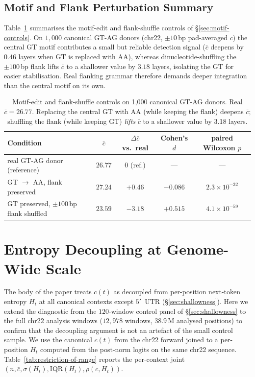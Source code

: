 \documentclass{article}
\theoremstyle{plain}
\theoremstyle{definition}
\theoremstyle{remark}
\begin{document}
\subsection{Motif and Flank Perturbation Summary}
\label{app:motif-flank}

Table~\ref{tab:motif-flank} summarises the motif-edit and flank-shuffle
controls of \S\ref{sec:motif-controls}. On $1{,}000$ canonical GT-AG
donors (chr22, $\pm 10$\,bp pad-averaged $c$) the central GT motif
contributes a small but reliable detection signal ($\bar c$ deepens by
$0.46$ layers when GT is replaced with AA), whereas dinucleotide-shuffling
the $\pm 100$\,bp flank lifts $\bar c$ to a shallower value by $3.18$ layers, isolating the
GT for easier stabilisation. Real flanking grammar therefore demands
deeper integration than the central motif on its own.

\begin{table}[!htbp]
  \caption{Motif-edit and flank-shuffle controls on 1{,}000 canonical
    GT-AG donors. Real $\bar c\!=\!26.77$. Replacing the central GT with AA
    (while keeping the flank) deepens $\bar c$; shuffling the flank
  (while keeping GT) \emph{lifts} $\bar c$ to a shallower value by 3.18 layers.}
  \label{tab:motif-flank}
  \centering
  \small
  \begin{tabular}{@{}lcccc@{}}
    \toprule
    Condition & $\bar c$ & $\Delta \bar c$ vs.\ real & Cohen's $d$ & paired Wilcoxon $p$ \\
    \midrule
    real GT-AG donor (reference)             & $26.77$ & $0$ (ref.)   & ---     & --- \\
    GT $\to$ AA, flank preserved             & $27.24$ & $+0.46$      & $-0.086$ & $2.3\!\times\!10^{-32}$ \\
    GT preserved, $\pm 100$\,bp flank shuffled & $23.59$ & $\mathbf{-3.18}$ & $\mathbf{+0.515}$ & $4.1\!\times\!10^{-59}$ \\
    \bottomrule
  \end{tabular}
\end{table}

\section{Entropy Decoupling at Genome-Wide Scale}
\label{app:restriction-of-range}

The body of the paper treats $c(t)$ as decoupled from per-position
next-token entropy $H_t$ at all canonical contexts except $5'$~UTR
(\S\ref{sec:shallowness}). Here we extend the diagnostic from the
$120$-window control panel of \S\ref{sec:shallowness} to the full
chr22 analysis windows ($12{,}978$ windows, $38.9$\,M analysed positions)
to confirm that the decoupling argument is not an artefact of the
small control sample. We use the canonical $c(t)$ from the chr22 forward
joined to a per-position $H_t$ computed from the post-norm logits on
the same chr22 sequence. Table~\ref{tab:restriction-of-range} reports
the per-context joint $(n, \bar c, \sigma(H_t), \mathrm{IQR}(H_t),
\rho(c, H_t))$.
\end{document}
